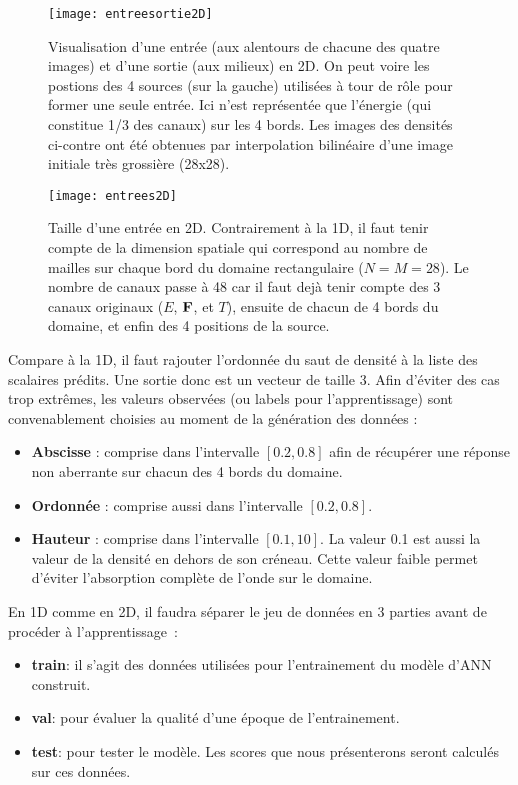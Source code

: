 \begin{figure}[!h]
\centering
\texttt{[image: entreesortie2D]} 
\decoRule
\caption[entreesortie2D]{Visualisation d'une entrée (aux alentours de chacune des quatre images) et d'une sortie (aux milieux) en 2D. On peut voire les postions des 4 sources (sur la gauche) utilisées à tour de rôle pour former une seule entrée. Ici n'est représentée que l'énergie (qui constitue 1/3 des canaux) sur les 4 bords. Les images des densités ci-contre ont été obtenues par interpolation bilinéaire d'une image initiale très grossière (28x28).}
\label{fig:entreesortie2D}
\end{figure}

\begin{figure}[!h]
  \centering
  \texttt{[image: entrees2D]} 
  \decoRule
  \caption[entrees2D]{Taille d'une entrée en 2D. Contrairement à la 1D, il faut tenir compte de la dimension spatiale qui correspond au nombre de mailles sur chaque bord du domaine rectangulaire ($N=M=28$). Le nombre de canaux passe à 48 car il faut dejà tenir compte des 3 canaux originaux ($E$, $\mathbf{F}$, et $T$), ensuite de chacun de 4 bords du domaine, et enfin des 4 positions de la source.}
  \label{fig:entrees2D}
\end{figure}

Compare à la 1D, il faut rajouter l'ordonnée du saut de densité à la liste des scalaires prédits. Une sortie donc est un vecteur de taille 3. Afin d'éviter des cas trop extrêmes, les valeurs observées (ou labels pour l'apprentissage) sont convenablement choisies au moment de la génération des données :
\begin{itemize}
 \item \textbf{Abscisse} : comprise dans l'intervalle $[0.2,0.8]$ afin de récupérer une réponse non aberrante sur chacun des 4 bords du domaine.
 \item \textbf{Ordonnée} : comprise aussi dans l'intervalle $[0.2,0.8]$.
 \item \textbf{Hauteur} : comprise dans l'intervalle $[0.1,10]$. La valeur 0.1 est aussi la valeur de la densité en dehors de son créneau. Cette valeur faible permet d'éviter l'absorption complète de l'onde sur le domaine.
\end{itemize}

En 1D comme en 2D, il faudra séparer le jeu de données en 3 parties avant de procéder à l'apprentissage :
\begin{itemize}
  \item \textbf{train}: il s'agit des données utilisées pour l'entrainement du modèle d'ANN construit.
  \item \textbf{val}: pour évaluer la qualité d'une époque de l'entrainement.
  \item \textbf{test}: pour tester le modèle. Les scores que nous présenterons seront calculés sur ces données. 
\end{itemize}

